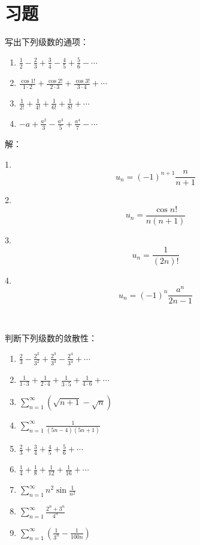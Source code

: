 \section{习题}

\begin{exercise}
写出下列级数的通项：
\begin{enumerate}
    \item $\frac{1}{2}-\frac{2}{3}+\frac{3}{4}-\frac{4}{5}+\frac{5}{6}-\cdots $
    \item $\frac{\cos 1!}{1\cdot 2}+\frac{\cos 2!}{2\cdot 3}+\frac{\cos 3!}{3\cdot 4}+\cdots $
    \item $\frac{1}{2!}+\frac{1}{4!}+\frac{1}{6!}+\frac{1}{8!}+\cdots $
    \item $-a+\frac{a^2}{3}-\frac{a^3}{5}+\frac{a^4}{7}-\cdots $
\end{enumerate}
\end{exercise}

解：

1.
\[
u_n=\left( -1 \right) ^{n+1}\frac{n}{n+1}
\]

2.
\[
u_n=\frac{\cos n!}{n\left( n+1 \right)}
\]

3.
\[
u_n=\frac{1}{\left( 2n \right) !}
\]

4.
\[
u_n=\left( -1 \right) ^n\frac{a^n}{2n-1}
\]

~

\begin{exercise}
判断下列级数的敛散性：
\begin{enumerate}
    \item $\frac{2}{3}-\frac{2^2}{3^2}+\frac{2^3}{3^3}-\frac{2^4}{3^4}+\cdots $
    \item $\frac{1}{1\cdot 3}+\frac{1}{2\cdot 4}+\frac{1}{3\cdot 5}+\frac{1}{4\cdot 6}+\cdots $
    \item $\sum_{n=1}^{\infty}{\left( \sqrt{n+1}-\sqrt{n} \right)}$
    \item $\sum_{n=1}^{\infty}{\frac{1}{\left( 5n-4 \right) \left( 5n+1 \right)}}$
    \item $\frac{2}{3}+\frac{3}{4}+\frac{4}{5}+\frac{5}{6}+\cdots $
    \item $\frac{1}{4}+\frac{1}{8}+\frac{1}{12}+\frac{1}{16}+\cdots $
    \item $\sum_{n=1}^{\infty}{n^2\sin \frac{1}{n^2}}$
    \item $\sum_{n=1}^{\infty}{\frac{2^n+3^n}{4^n}}$
    \item $\sum_{n=1}^{\infty}{\left( \frac{1}{3^n}-\frac{1}{100n} \right)}$
\end{enumerate}
\end{exercise}

